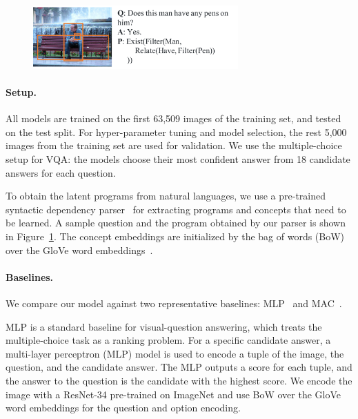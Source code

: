 \documentclass{article} %
\begin{document}
{\begin{figure}[thbp]
    \centering
    \includegraphics[width=0.7\textwidth]{raw/VQAExample.pdf}
    \label{fig:vqs:example}
\end{figure}

\paragraph{Setup. } All models are trained on the first 63,509 images of the training set, and tested on the test split. For hyper-parameter tuning and model selection, the rest 5,000 images from the training set are used for validation. We use the multiple-choice setup for VQA: the models choose their most confident answer from 18 candidate answers for each question.

To obtain the latent programs from natural languages, we use a pre-trained syntactic dependency parser~\citep{Andreas2016Learning,Schuster2015Generating} for extracting programs and concepts that need to be learned. A sample question and the program obtained by our parser is shown in Figure~\ref{fig:vqs:example}. The concept embeddings are initialized by the bag of words (BoW) over the GloVe word embeddings~\citep{pennington2014glove}.

\paragraph{Baselines. } We compare our model against two representative baselines: MLP~\citep{Jabri2016Revisiting} and MAC~\citep{Hudson2018Compositional}.

MLP is a standard baseline for visual-question answering, which treats the multiple-choice task as a ranking problem. For a specific candidate answer, a multi-layer perceptron (MLP) model is used to encode a tuple of the image, the question, and the candidate answer. The MLP outputs a score for each tuple, and the answer to the question is the candidate with the highest score. We encode the image with a ResNet-34 pre-trained on ImageNet and use BoW over the GloVe word embeddings for the question and option encoding.

}
\end{document}
